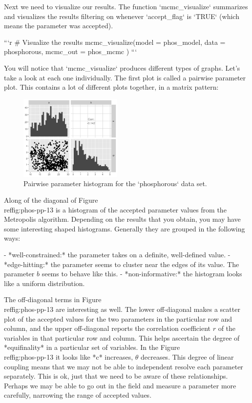\documentclass[
]{book}
\theoremstyle{definition}
\theoremstyle{definition}
\theoremstyle{definition}
\theoremstyle{remark}
\begin{document}
Next we need to visualize our results. The function `mcmc_visualize` summarizes and visualizes the results filtering on whenever `accept_flag` is `TRUE` (which means the parameter was accepted).


```r
# Visualize the results
mcmc_visualize(model = phos_model,
               data = phosphorous,
               mcmc_out = phos_mcmc
               )
```

You will notice that `mcmc_visualize` produces different types of graphs.  Let's take a look at each one individually.  The first plot is called a pairwise parameter plot.  This contains a lot of different plots together, in a matrix pattern:


\begin{figure}
\includegraphics[width=2in]{figures/13-mcmc/histogram} \caption{Pairwise parameter histogram for the `phosphorous` data set.}\label{fig:phos-pp-13}
\end{figure}

Along of the diagonal of Figure \\ref{fig:phos-pp-13} is a histogram of the accepted parameter values from the Metropolis algorithm. Depending on the results that you obtain, you may have some interesting shaped histograms.  Generally they are grouped in the following ways:

- *well-constrained:* the parameter takes on a definite, well-defined value.
- *edge-hitting:* the parameter seems to cluster near the edges of its value.  The parameter $b$ seems to behave like this.
- *non-informative:* the histogram looks like a uniform distribution.

The off-diagonal terms in Figure \\ref{fig:phos-pp-13} are interesting as well.  The lower off-diagonal makes a scatter plot of the accepted values for the two parameters in the particular row and column, and the upper off-diagonal reports the correlation coefficient $r$ of the variables in that particular row and column.  This helps ascertain the degree of *equifinality* in a particular set of variables.  In the Figure \\ref{fig:phos-pp-13} it looks like *c* increases, $\theta$ decreases.  This degree of linear coupling means that we may not be able to independent resolve each parameter separately.  This is ok, just that we need to be aware of these relationships.  Perhaps we may be able to go out in the field and measure a parameter more carefully, narrowing the range of accepted values.
\end{document}
